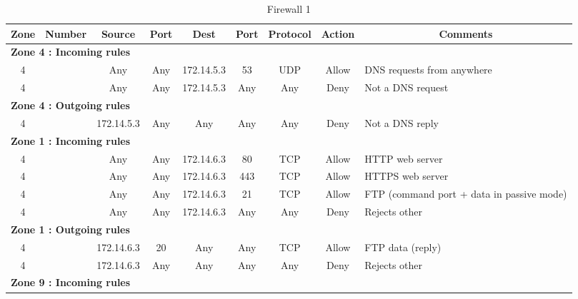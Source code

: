\documentclass[a4paper,titlepage]{article}
\begin{document}

\begin{table}[h]
	\center
	\begin{tabular}{c|c|cc|cc|ccl}
		Zone & Number & Source & Port & Dest & Port & Protocol & Action & \multicolumn{1}{c}{Comments}\\

		\hline
		\multicolumn{9}{l}{\textbf{Zone 4 : Incoming rules}}\\
		4 &  & Any & Any & 172.14.5.3 & 53 & UDP & Allow & DNS requests from anywhere\\
		4 &  & Any & Any & 172.14.5.3 & Any & Any & Deny & Not a DNS request\\

		\hline
		\multicolumn{9}{l}{\textbf{Zone 4 : Outgoing rules}}\\
		4 &  & 172.14.5.3 & Any & Any & Any & Any & Deny & Not a DNS reply\\

		\hline
		\multicolumn{9}{l}{\textbf{Zone 1 : Incoming rules}}\\
		4 &  & Any & Any & 172.14.6.3 & 80 & TCP & Allow & HTTP web server\\
		4 &  & Any & Any & 172.14.6.3 & 443 & TCP & Allow & HTTPS web server\\
		4 &  & Any & Any & 172.14.6.3 & 21 & TCP & Allow & FTP (command port + data in passive mode)\\
		4 &  & Any & Any & 172.14.6.3 & Any & Any & Deny & Rejects other\\

		\hline
		\multicolumn{9}{l}{\textbf{Zone 1 : Outgoing rules}}\\
		4 & & 172.14.6.3 & 20 & Any & Any & TCP & Allow & FTP data (reply)\\
		4 & & 172.14.6.3 & Any & Any & Any & Any & Deny & Rejects other\\

		\hline
		\multicolumn{9}{l}{\textbf{Zone 9 : Incoming rules}}\\
	\end{tabular}
	\caption{Firewall 1}
\end{table}

\end{document}
